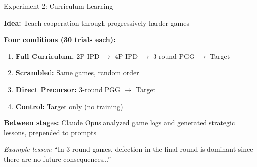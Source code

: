 \documentclass[aspectratio=169]{beamer}
\begin{document}
\begin{frame}{Experiment 2: Curriculum Learning}
  
  \textbf{Idea:} Teach cooperation through progressively harder games
  
  \vspace{1em}
  \textbf{Four conditions (30 trials each):}
  \begin{enumerate}
    \item \textbf{Full Curriculum:} 2P-IPD $\to$ 4P-IPD $\to$ 3-round PGG $\to$ Target
    \item \textbf{Scrambled:} Same games, random order
    \item \textbf{Direct Precursor:} 3-round PGG $\to$ Target
    \item \textbf{Control:} Target only (no training)
  \end{enumerate}
  
  \vspace{1em}
  \textbf{Between stages:} Claude Opus analyzed game logs and generated strategic lessons, prepended to prompts
  
  \vspace{0.5em}
  \textit{Example lesson:} ``In 3-round games, defection in the final round is dominant since there are no future consequences...''

\end{frame}
\end{document}
